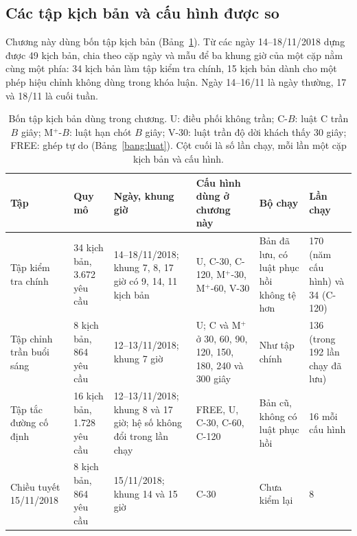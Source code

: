 \subsection{Các tập kịch bản và cấu hình được so}
\label{muc:c4-taptu}

Chương này dùng bốn tập kịch bản (Bảng~\ref{bang:c4-taptu}). Từ các ngày 14--18/11/2018 dựng được 49 kịch bản, chia
theo cặp ngày và mẫu để ba khung giờ của một cặp nằm cùng một phía: 34 kịch bản làm tập kiểm tra chính, 15 kịch bản
dành cho một phép hiệu chỉnh không dùng trong khóa luận. Ngày 14--16/11 là ngày thường, 17 và 18/11 là cuối tuần.

\begin{table}[htbp]
\centering
\caption{Bốn tập kịch bản dùng trong chương. U: điều phối không trần; C-$B$: luật C trần $B$ giây;
M$^{+}$-$B$: luật hạn chót $B$ giây; V-30: luật trần độ dời khách thấy 30 giây; FREE: ghép tự do
(Bảng~\ref{bang:luat}). Cột cuối là số lần chạy, mỗi lần một cặp kịch bản và cấu hình.}
\label{bang:c4-taptu}
\footnotesize
\setlength{\tabcolsep}{3pt}
\begin{tabular}{@{}p{2.5cm}p{1.9cm}p{3.1cm}p{3.0cm}p{2.6cm}p{1.9cm}@{}}
\toprule
\textbf{Tập} & \textbf{Quy mô} & \textbf{Ngày, khung giờ} & \textbf{Cấu hình dùng ở chương này} &
\textbf{Bộ chạy} & \textbf{Lần chạy}\\
\midrule
Tập kiểm tra chính & 34 kịch bản, 3.672 yêu cầu & 14--18/11/2018; khung 7, 8, 17 giờ có 9, 14, 11
kịch bản & U, C-30, C-120, M$^{+}$-30, M$^{+}$-60, V-30 & Bản đã lưu, có luật phục hồi không tệ hơn &
170 (năm cấu hình) và 34 (C-120)\\
Tập chỉnh trần buổi sáng & 8 kịch bản, 864 yêu cầu & 12--13/11/2018; khung 7 giờ & U; C và M$^{+}$ ở 30, 60,
90, 120, 150, 180, 240 và 300 giây & Như tập chính & 136 (trong 192 lần chạy đã lưu)\\
Tập tắc đường cố định & 16 kịch bản, 1.728 yêu cầu & 12--13/11/2018; khung 8 và 17 giờ; hệ số không
đổi trong lần chạy & FREE, U, C-30, C-60, C-120 & Bản cũ, không có luật phục hồi & 16 mỗi cấu hình\\
Chiều tuyết 15/11/2018 & 8 kịch bản, 864 yêu cầu & 15/11/2018; khung 14 và 15 giờ & C-30 &
Chưa kiểm lại & 8\\
\bottomrule
\end{tabular}
\end{table}

